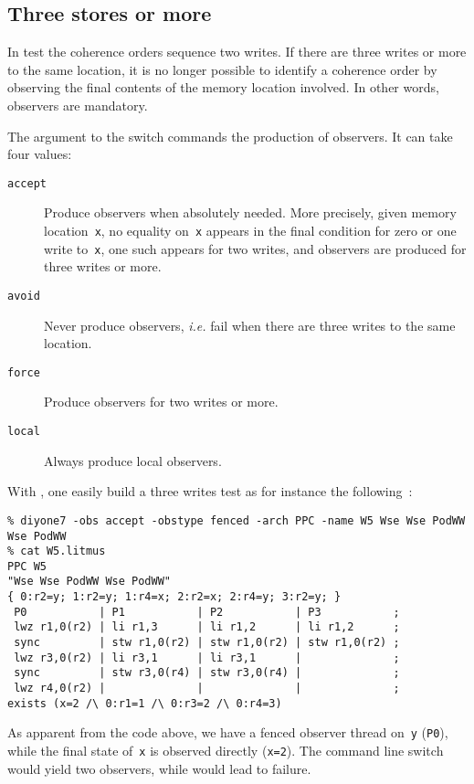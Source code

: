 \subsection{Three \label{sec:obs}stores or more}
In test  the coherence orders sequence two writes.
If there are three writes or more to the same location,
it is no longer possible to
identify a coherence order by observing the final contents of the
memory location involved. In other words, observers are mandatory.

The argument to the  switch commands
the production of observers. It can take four values:
\begin{description}
\item[{\tt accept}] Produce observers when absolutely needed.
More precisely, given memory location~\texttt{x}, no equality
on~\texttt{x} appears
in the final condition for zero or one write to~\texttt{x},
one such appears for two writes, and observers are produced for
three writes or more.
\item[{\tt avoid}] Never produce observers, \emph{i.e.} fail when there
are three writes to the same location.
\item[{\tt force}] Produce observers for two writes or more.
\item[{\tt local}] Always produce local observers.
\end{description}

With \diyone, one easily build a three writes test as for instance
the following~:
\begin{verbatim}
% diyone7 -obs accept -obstype fenced -arch PPC -name W5 Wse Wse PodWW Wse PodWW
% cat W5.litmus
PPC W5
"Wse Wse PodWW Wse PodWW"
{ 0:r2=y; 1:r2=y; 1:r4=x; 2:r2=x; 2:r4=y; 3:r2=y; }
 P0           | P1           | P2           | P3           ;
 lwz r1,0(r2) | li r1,3      | li r1,2      | li r1,2      ;
 sync         | stw r1,0(r2) | stw r1,0(r2) | stw r1,0(r2) ;
 lwz r3,0(r2) | li r3,1      | li r3,1      |              ;
 sync         | stw r3,0(r4) | stw r3,0(r4) |              ;
 lwz r4,0(r2) |              |              |              ;
exists (x=2 /\ 0:r1=1 /\ 0:r3=2 /\ 0:r4=3)
\end{verbatim}
As apparent from the code above, we have a fenced observer thread
on~\texttt{y} (\verb+P0+),
while the final state of~\texttt{x} is observed directly
(\verb+x=2+).
The command line switch  would yield two observers,
while  would lead to failure.

